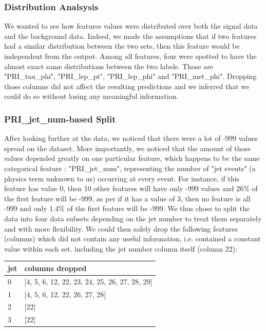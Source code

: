 \documentclass[10pt,conference,compsocconf]{IEEEtran}
\begin{document}
\subsubsection{Distribution Analsysis}
We wanted to see how features values were distributed over both the signal data and the background data. Indeed, we made the assumptions that if two features had a similar distribution between the two sets, then this feature would be independent from the output. Among all features, four were spotted to have the almost exact same distributions between the two labels. Those are "PRI\_tau\_phi", "PRI\_lep\_pt", "PRI\_lep\_phi" and "PRI\_met\_phi". Dropping those columns did not affect the resulting predictions and we inferred that we could do so without losing any meaningful information.

\subsubsection{PRI\_jet\_num-based Split}
After looking further at the data, we noticed that there were a lot of -999 values spread on the dataset. More importantly, we noticed that the amount of those values depended greatly on one particular feature, which happens to be the same categorical feature : "PRI\_jet\_num", representing the number of "jet events" (a physics term unknown to us) occurring at every event. For instance, if this feature has value 0, then 10 other features will have only -999 values and 26\% of the first feature will be -999, as per if it has a value of 3, then no feature is all -999 and only 1.4\% of the first feature will be -999.
We thus chose to split the data into four data subsets depending on the jet number to treat them separately and with more flexibility. We could then safely drop the following features (columns) which did not contain any useful information, i.e. contained a constant value within each set. including the jet number column itself (column 22):

\vspace{1em}
\begin{tabular}{l|l}
\hline
 jet  & columns dropped \\
\hline
0 & [4, 5, 6, 12, 22, 23, 24, 25, 26, 27, 28, 29] \\
1 & [4, 5, 6, 12, 22, 26, 27, 28] \\
2 & [22]  \\
3 & [22]\\
\hline
\end{tabular}
\vspace{1em}
\end{document}
